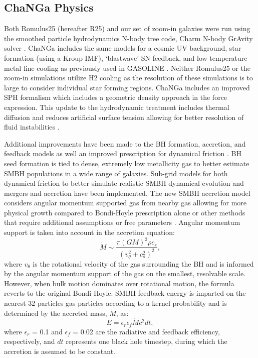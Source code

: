 \documentclass[]{emulateapj}
\begin{document}
\subsection{ChaNGa Physics} 
Both {\sc Romulus25}  (hereafter R25) and our set of zoom-in galaxies were run using the smoothed particle hydrodynamics N-body tree code, Charm N-body GrAvity solver \citep[ChaNGa,][]{Menon2015}. ChaNGa includes the same models for a cosmic UV background, star formation (using a Kroup IMF), `blastwave' SN feedback, and low temperature metal line cooling as previously used in GASOLINE \citep{Wadsley2004,Wadsley2008,Stinson2006,Shen2010}. Neither {\sc Romulus25}  or the zoom-in simulations utilize H2 cooling as the resolution of these simulations is to large to consider individual star forming regions. ChaNGa includes an improved SPH formalism which includes a geometric density approach in the force expression. This update to the hydrodynamic treatment includes thermal diffusion \citep{Shen2010} and reduces artificial surface tension allowing for better resolution of fluid instabilities \citep{Ritchie2001,Menon2015,Governato2015}. 

Additional improvements have been made to the BH formation, accretion, and feedback models as well an improved prescription for dynamical friction \citep{Tremmel2015,Tremmel2017}. BH seed formation is tied to dense, extremely low metallicity gas to better estimate SMBH populations in a wide range of galaxies. Sub-grid models for both dynamical friction \textemdash to better simulate realistic SMBH dynamical evolution and mergers \textemdash and accretion have been implemented. The new SMBH accretion model considers angular momentum supported gas from nearby gas allowing for more physical growth compared to Bondi-Hoyle prescription alone or other methods that require additional assumptions or free parameters \citep{Rosas-Guevara2015,Angles-Alcazar2017}. Angular momentum support is taken into account in the accretion equation:
\begin{equation}
\dot{M} \sim \frac{\pi (GM)^2 \rho c_s}{(v_{\theta}^2 + c_s^2)^2},
\end{equation}
where $v_{\theta}$ is the rotational velocity of the gas surrounding the BH and is informed by the angular momentum support of the gas on the smallest, resolvable scale. However, when bulk motion dominates over rotational motion, the formula reverts to the original Bondi-Hoyle.
SMBH feedback energy is imparted on the nearest 32 particles gas particles according to a kernel probability and is determined by the accreted mass, $\dot{M}$, as: 
\begin{equation}
E = \epsilon_{r} \epsilon_{f} \dot{M} c^2 dt, 
\end{equation}
where $\epsilon_{r}$ = 0.1 and $\epsilon_{f}$ = 0.02 are the radiative and feedback efficiency, respectively, and $dt$ represents one black hole timestep, during which the accretion is assumed to be constant.  
\end{document}
